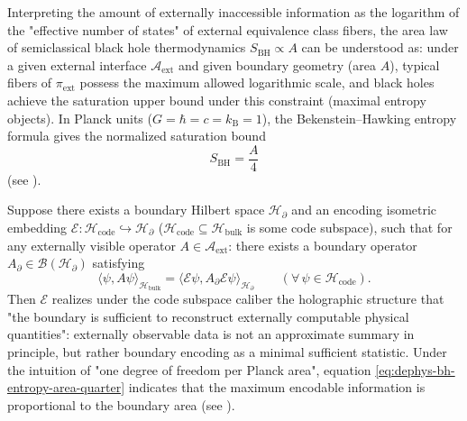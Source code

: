 \begin{proposition}\label{prop:dephys-horizon-fiber-capacity-area-law}
Interpreting the amount of externally inaccessible information as the logarithm of the "effective number of states" of external equivalence class fibers,
the area law of semiclassical black hole thermodynamics
\(
S_{\mathrm{BH}}\propto A
\)
can be understood as: under a given external interface \(\mathcal{A}_{\mathrm{ext}}\) and given boundary geometry (area \(A\)),
typical fibers of \(\pi_{\mathrm{ext}}\) possess the maximum allowed logarithmic scale, and black holes achieve the saturation upper bound under this constraint (maximal entropy objects).
In Planck units (\(G=\hbar=c=k_{\mathrm B}=1\)),
the Bekenstein--Hawking entropy formula gives the normalized saturation bound
\begin{equation}\label{eq:dephys-bh-entropy-area-quarter}
\boxed{\;
S_{\mathrm{BH}}=\frac{A}{4}\;}
\end{equation}
(see \cite{Bekenstein1973BlackHolesEntropy,Hawking1975ParticleCreation}).
\end{proposition}

\begin{theorem}\label{thm:dephys-holography-sufficient-statistic}
Suppose there exists a boundary Hilbert space \(\mathcal{H}_{\partial}\) and an encoding isometric embedding
\(
\mathcal{E}:\mathcal{H}_{\mathrm{code}}\hookrightarrow \mathcal{H}_{\partial}
\)
(\(\mathcal{H}_{\mathrm{code}}\subseteq\mathcal{H}_{\mathrm{bulk}}\) is some code subspace), such that for any externally visible operator \(A\in\mathcal{A}_{\mathrm{ext}}\):
there exists a boundary operator \(A_{\partial}\in\mathcal{B}(\mathcal{H}_{\partial})\) satisfying
\begin{equation}\label{eq:dephys-holography-reconstruction}
\boxed{\;
\langle\psi, A\psi\rangle_{\mathcal{H}_{\mathrm{bulk}}}
=
\langle\mathcal{E}\psi, A_{\partial}\mathcal{E}\psi\rangle_{\mathcal{H}_{\partial}}
\qquad(\forall\,\psi\in\mathcal{H}_{\mathrm{code}}).\;}
\end{equation}
Then \(\mathcal{E}\) realizes under the code subspace caliber the holographic structure that "the boundary is sufficient to reconstruct externally computable physical quantities":
externally observable data is not an approximate summary in principle, but rather boundary encoding as a minimal sufficient statistic.
Under the intuition of "one degree of freedom per Planck area", equation \eqref{eq:dephys-bh-entropy-area-quarter} indicates that the maximum encodable information is proportional to the boundary area (see \cite{tHooft1993DimensionalReductionQuantumGravity,Susskind1995WorldAsHologram}).
\end{theorem}

